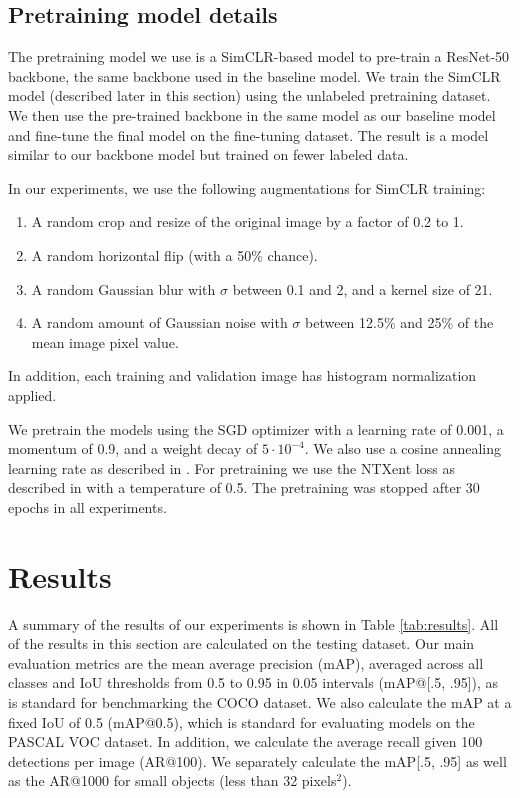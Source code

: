 \documentclass[conference]{IEEEtran}
\begin{document}
\subsection{Pretraining model details}

The pretraining model we use is a SimCLR-based model \cite{chenSimpleFrameworkContrastive2020} to pre-train a ResNet-50 backbone, the same backbone used in the baseline model. We train the SimCLR model (described later in this section) using the unlabeled pretraining dataset. We then use the pre-trained backbone in the same model as our baseline model and fine-tune the final model on the fine-tuning dataset. The result is a model similar to our backbone model but trained on fewer labeled data.

In our experiments, we use the following augmentations for SimCLR training:

\begin{enumerate}
\item A random crop and resize of the original image by a factor of 0.2 to 1.
\item A random horizontal flip (with a 50\% chance).
\item A random Gaussian blur with $\sigma$ between 0.1 and 2, and a kernel size of 21.
\item A random amount of Gaussian noise with $\sigma$ between 12.5\% and 25\% of the mean image pixel value.
\end{enumerate}

In addition, each training and validation image has histogram normalization applied.

We pretrain the models using the SGD optimizer with a learning rate of 0.001, a 
momentum of 0.9, and a weight decay of $5\cdot10^{-4}$. We also use a cosine 
annealing learning rate as described in \cite{loshchilovSGDRStochasticGradient2017}. 
For pretraining we use the NTXent loss as described in  \cite{chenSimpleFrameworkContrastive2020} with a temperature of 0.5.
The pretraining was stopped after 30 epochs in all experiments.

\section{Results}\label{sec2}

A summary of the results of our experiments is shown in Table \ref{tab:results}. All of the results in this section are calculated on the testing dataset. Our main evaluation metrics are the mean average precision (mAP), averaged across all classes and IoU thresholds from 0.5 to 0.95 in 0.05 intervals (mAP@[.5, .95]), as is standard for benchmarking the COCO dataset. We also calculate the mAP at a fixed IoU of 0.5 (mAP@0.5), which is standard for evaluating models on the PASCAL VOC dataset. In addition, we calculate the average recall given 100 detections per image (AR@100). We separately calculate the mAP[.5, .95] as well as the AR@1000 for small objects (less than 32 pixels$^2$).
\end{document}
